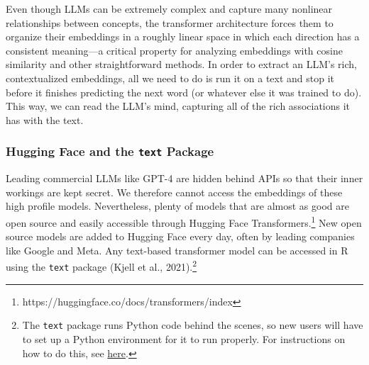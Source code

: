 \documentclass[
  man,
  floatsintext,
  longtable,
  nolmodern,
  notxfonts,
  notimes,
  colorlinks=true,linkcolor=blue,citecolor=blue,urlcolor=blue]{apa7}
\begin{document}
Even though LLMs can be extremely complex and capture many nonlinear
relationships between concepts, the transformer architecture forces them
to organize their embeddings in a roughly linear space in which each
direction has a consistent meaning---a critical property for analyzing
embeddings with cosine similarity and other straightforward methods. In
order to extract an LLM's rich, contextualized embeddings, all we need
to do is run it on a text and stop it before it finishes predicting the
next word (or whatever else it was trained to do). This way, we can read
the LLM's mind, capturing all of the rich associations it has with the
text.

\subsubsection{\texorpdfstring{Hugging Face and the \texttt{text}
Package}{Hugging Face and the text Package}}\label{hugging-face-and-the-text-package}

Leading commercial LLMs like GPT-4 are hidden behind APIs so that their
inner workings are kept secret. We therefore cannot access the
embeddings of these high profile models. Nevertheless, plenty of models
that are almost as good are open source and easily accessible through
Hugging Face Transformers.\footnote{https://huggingface.co/docs/transformers/index}
New open source models are added to Hugging Face every day, often by
leading companies like Google and Meta. Any text-based transformer model
can be accessed in R using the \texttt{text} package (Kjell et al.,
2021).\footnote{The \texttt{text} package runs Python code behind the
  scenes, so new users will have to set up a Python environment for it
  to run properly. For instructions on how to do this, see
  \href{https://www.r-text.org/articles/huggingface_in_r_extended_installation_guide.html}{here}.}
\end{document}

